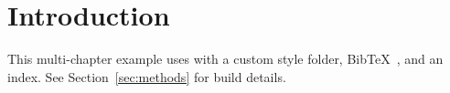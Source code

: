 \section{Introduction}\label{sec:intro}

This multi-chapter example uses \projectname{} with a custom
style folder, BibTeX~\cite{knuth1984}, and an index. See
Section~\ref{sec:methods} for build details.
